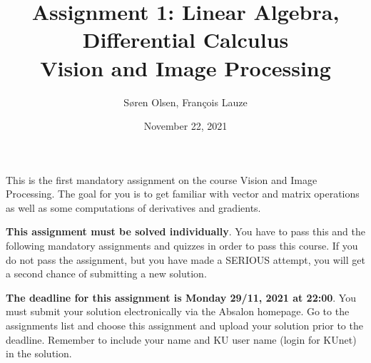 \documentclass[a4paper,10pt]{article}
\begin{document}
\title{Assignment 1: Linear Algebra, Differential Calculus\\
Vision and Image Processing}
\author{S{\o}ren Olsen, Fran\c{c}ois Lauze}
\date{November 22, 2021}
\maketitle


\noindent 
This is the first mandatory assignment on the course Vision and Image
Processing. The goal for you is to get familiar with vector and matrix operations as well as some computations of derivatives and gradients.
\bigskip

{\bf This assignment must be solved individually}.  You have to pass
this and the following mandatory assignments and quizzes in order to
pass this course.  If you do not pass the assignment, but you have
made a SERIOUS attempt, you will get a second chance of submitting a
new solution.  
\bigskip

{\bf The deadline for this assignment is Monday 29/11, 2021 at 22:00}. 
You must submit your solution electronically via the Absalon homepage. Go to
the assignments list and choose this assignment and upload your
solution prior to the deadline.  Remember to include your name and KU
user name (login for {KU}net) in the solution. 
\end{document}

